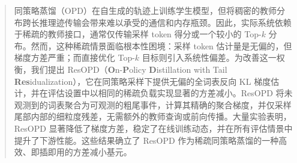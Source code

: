 \begin{abstract}
同策略蒸馏（OPD）在自生成的轨迹上训练学生模型，但将稠密的教师分布跨长推理迹传输会带来难以承受的通信和内存瓶颈。因此，实际系统依赖于稀疏的教师接口，通常仅传输采样 token 得分或一个较小的 Top-$k$  分布。然而，这种稀疏情景面临根本性困境：采样 token 估计量是无偏的，但梯度方差严重；而直接优化 Top-$k$  目标则引入系统性偏差。为改善这一权衡，我们提出 ResOPD（\textbf{O}n-\textbf{P}olicy \textbf{D}istillation with Tail \textbf{Res}idualization），它在同策略采样下提供无偏的全词表反向 KL 梯度估计，并在评估设置中以相同的稀疏负载实现显著的方差减小。ResOPD 将未观测到的词表聚合为可观测的粗尾事件，计算其精确的聚合梯度，并仅采样尾部内部的细粒度残差，无需额外的教师查询或前向传播。大量实验表明，ResOPD 显著降低了梯度方差，稳定了在线训练动态，并在所有评估情景中提升了下游性能。这些结果确立了 ResOPD 作为稀疏同策略蒸馏的一种高效、即插即用的方差减小基元。
\end{abstract}